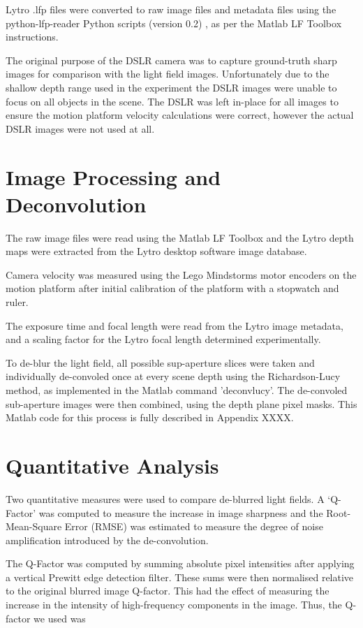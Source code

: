 Lytro .lfp files were converted to raw image files and metadata files using the python-lfp-reader Python scripts (version 0.2) \cite{esfahbod2013python}, as per the Matlab LF Toolbox instructions.

The original purpose of the DSLR camera was to capture ground-truth sharp images for comparison with the light field images.
Unfortunately due to the shallow depth range used in the experiment the DSLR images were unable to focus on all objects in the scene.
The DSLR was left in-place for all images to ensure the motion platform velocity calculations were correct, however the actual DSLR images were not used at all.

\section{Image Processing and Deconvolution}
\label{sec:image_processing_and_deconvolution}

The raw image files were read using the Matlab LF Toolbox and the Lytro depth maps were extracted from the Lytro desktop software image database.

Camera velocity was measured using the Lego Mindstorms motor encoders on the motion platform after initial calibration of the platform with a stopwatch and ruler.

The exposure time and focal length were read from the Lytro image metadata, and a scaling factor for the Lytro focal length determined experimentally.

To de-blur the light field, all possible sup-aperture slices were taken and individually de-convoled once at every scene depth using the Richardson-Lucy method, as implemented in the Matlab command 'deconvlucy'.
The de-convoled sub-aperture images were then combined, using the depth plane pixel masks.
This Matlab code for this process is fully described in Appendix XXXX.


\section{Quantitative Analysis}
\label{sec:quantitative_analysis}

Two quantitative measures were used to compare de-blurred light fields.
A \enquote*{Q-Factor} was computed to measure the increase in image sharpness and the Root-Mean-Square Error (RMSE) was estimated to measure the degree of noise amplification introduced by the de-convolution.

The Q-Factor was computed by summing absolute pixel intensities after applying a vertical Prewitt edge detection filter.
These sums were then normalised relative to the original blurred image Q-factor.
This had the effect of measuring the increase in the intensity of high-frequency components in the image.
Thus, the Q-factor we used was

